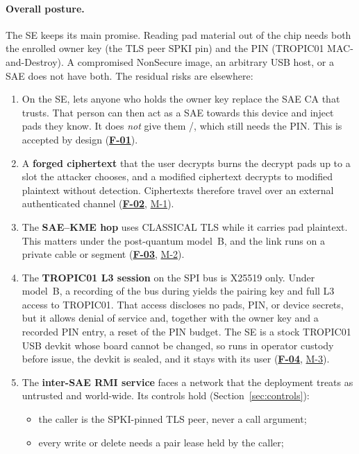 \documentclass[11pt,a4paper]{article}
\newcommand{\fid}[1]{\textbf{#1}}
\begin{document}
\paragraph{Overall posture.} The SE keeps its main promise. Reading pad material out of the chip needs both the enrolled owner key (the TLS peer SPKI pin) and the PIN (TROPIC01 MAC-and-Destroy). A compromised NonSecure image, an arbitrary USB host, or a SAE does not have both. The residual risks are elsewhere:
\begin{enumerate}
\item On the SE, \textbf{} lets anyone who holds the owner key replace the SAE CA that  trusts. That person can then act as a SAE towards this device and inject pads they know. It does \emph{not} give them /, which still needs the PIN. This is accepted by design (\hyperref[f:F-01]{\fid{F-01}}).
\item A \textbf{forged ciphertext} that the user decrypts burns the decrypt pads up to a slot the attacker chooses, and a modified ciphertext decrypts to modified plaintext without detection. Ciphertexts therefore travel over an external authenticated channel (\hyperref[f:F-02]{\fid{F-02}}, \hyperref[m:M-1]{M-1}).
\item The \textbf{SAE--KME hop} uses CLASSICAL TLS while it carries pad plaintext. This matters under the post-quantum model~B, and the link runs on a private cable or segment (\hyperref[f:F-03]{\fid{F-03}}, \hyperref[m:M-2]{M-2}).
\item The \textbf{TROPIC01 L3 session} on the SPI bus is X25519 only. Under model~B, a recording of the bus during  yields the pairing key and full L3 access to TROPIC01. That access discloses no pads, PIN, or device secrets, but it allows denial of service and, together with the owner key and a recorded PIN entry, a reset of the PIN budget. The SE is a stock TROPIC01 USB devkit whose board cannot be changed, so  runs in operator custody before issue, the devkit is sealed, and it stays with its user (\hyperref[f:F-04]{\fid{F-04}}, \hyperref[m:M-3]{M-3}).
\item The \textbf{inter-SAE RMI service} faces a network that the deployment treats as untrusted and world-wide. Its controls hold (Section~\ref{sec:controls}):
  \begin{itemize}
  \item the caller is the SPKI-pinned TLS peer, never a call argument;
  \item every write or delete needs a pair lease held by the caller;

\end{itemize}
\end{enumerate}
\end{document}

